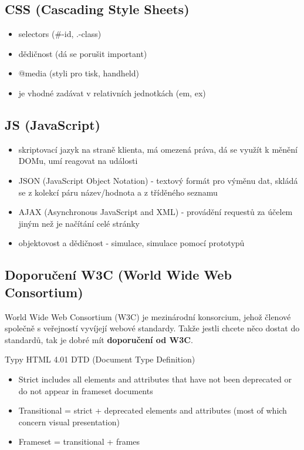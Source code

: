 \documentclass{scrreprt}
\begin{document}
    
\subsection{CSS (Cascading Style Sheets)}
\begin{itemize}
  \item selectors (\#-id, .-class)
  \item dědičnost (dá se porušit important)
  \item @media (styli pro tisk, handheld)
  \item je vhodné zadávat v relativních jednotkách (em, ex)
\end{itemize}


\subsection{JS (JavaScript)}
\begin{itemize}
  \item skriptovací jazyk na straně klienta, má omezená práva, dá se využít k měnění DOMu, umí reagovat na události
  \item JSON (JavaScript Object Notation) - textový formát pro výměnu dat, skládá se z kolekcí páru název/hodnota a z tříděného seznamu
  \item AJAX (Asynchronous JavaScript and XML) - provádění requestů za účelem jiným než je načítání celé stránky
  \item objektovost a dědičnost - simulace,  simulace pomocí prototypů
\end{itemize}

    
\subsection{Doporučení W3C (World Wide Web Consortium)}
World Wide Web Consortium (W3C) je mezinárodní konsorcium, jehož členové společně s veřejností vyvíjejí webové standardy. Takže jestli chcete něco
dostat do standardů, tak je dobré mít \textbf{doporučení od W3C}.

Typy HTML 4.01 DTD (Document Type Definition)
\begin{itemize}
  \item Strict includes all elements and attributes that have not been deprecated or do not appear in frameset documents
  \item Transitional = strict + deprecated elements and attributes (most of which concern visual presentation)
  \item Frameset = transitional + frames
\end{itemize}    
        
\end{document}
